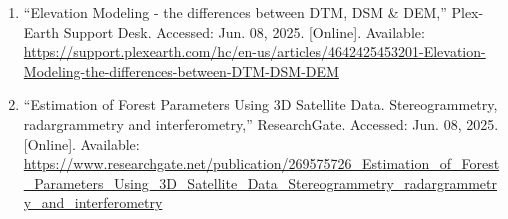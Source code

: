\documentclass{article}
\begin{document}
\begin{sloppypar}
\begin{enumerate}
    \item{“Elevation Modeling - the differences between DTM, DSM & DEM,” Plex-Earth Support Desk. Accessed: Jun. 08, 2025. [Online]. Available: \url{https://support.plexearth.com/hc/en-us/articles/4642425453201-Elevation-Modeling-the-differences-between-DTM-DSM-DEM}}

    \item{“Estimation of Forest Parameters Using 3D Satellite Data. Stereogrammetry, radargrammetry and interferometry,” ResearchGate. Accessed: Jun. 08, 2025. [Online]. Available: \url{https://www.researchgate.net/publication/269575726_Estimation_of_Forest_Parameters_Using_3D_Satellite_Data_Stereogrammetry_radargrammetry_and_interferometry}}


\end{enumerate}
\end{sloppypar}

\end{document}
